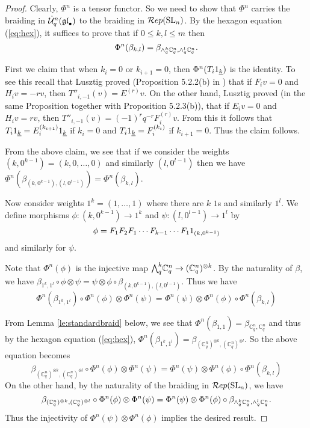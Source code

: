 \documentclass[11pt]{amsart}
\begin{document}
\begin{proof}
Clearly, $\Phi^n$ is a tensor functor.  So we need to show that $ \Phi^n $ carries the braiding in $ \dot{{\mathcal{U}}}_q^n({\mathfrak{gl}}_\bullet) $ to the braiding in $\mathcal{R}ep({\rm{SL}}_n) $.  By the hexagon equation (\ref{eq:hex}), it suffices to prove that if $ 0 \le k, l \le m $ then $$ \Phi^n(\beta_{k, l}) = \beta_{\wedge^{k}_{q} \mathbb C_q^n, \wedge^{l}_{q} \mathbb C_q^n}. $$

First we claim that when $ k_i = 0 $ or $ k_{i+1} = 0 $, then $ \Phi^n(T_i 1_{{\underline{k}}}) $ is the identity.  To see this recall that Lusztig proved (Proposition 5.2.2(b) in \cite{MR1227098}) that if $ F_i v = 0 $ and $ H_i v = -r v $, then $ T''_{i,-1}(v) = E^{(r)} v $.  On the other hand, Lusztig proved (in the same Proposition together with Proposition 5.2.3(b)), that if $ E_i v = 0 $ and $H_i v = rv $, then $ T''_{i,-1}(v) = (-1)^r q^{-r} F_i^{(r)} v $.  From this it follows that $ T_i 1_{{\underline{k}}} = E_i^{(k_{i+1})} 1_{{\underline{k}}} $ if $ k_i = 0 $ and $ T_i 1_{{\underline{k}}} = F_i^{(k_i)} $ if $ k_{i+1} = 0 $.  Thus the claim follows.

From the above claim, we see that if we consider the weights $ (k, 0^{k-1}) = (k, 0, \dots, 0)$ and similarly $ (l, 0^{l-1}) $ then we have $ \Phi^n(\beta_{(k, 0^{k-1}), (l, 0^{l-1})}) =  \Phi^n(\beta_{k, l})$.

Now consider weights $ 1^k = (1, \dots, 1) $ where there are $ k $ $1$s and similarly $ 1^l$.  We define morphisms $ \phi: (k, 0^{k-1})  \rightarrow 1^k$ and  $ \psi : (l, 0^{l-1}) \rightarrow 1^{l} $ by
$$
\phi = F_1 F_2 F_1 \cdots F_{k-1} \cdots F_1 1_{(k, 0^{k-1})}
$$
and similarly for $ \psi $.

Note that $ \Phi^n(\phi) $ is the injective map $ {\textstyle\bigwedge^{k}_{q}} \mathbb C_q^n \rightarrow (\mathbb C_q^n)^{\otimes k} $.  By the naturality of $ \beta $, we have $  \beta_{1^k, 1^l} \circ \phi \otimes \psi =  \psi \otimes \phi \circ \beta_{(k,0^{k-1}), (l, 0^{l-1})} $.  Thus we have
$$
  \Phi^n(\beta_{1^k, 1^l})\circ \Phi^n(\phi) \otimes \Phi^n(\psi) = \Phi^n(\psi) \otimes \Phi^n(\phi) \circ \Phi^n(\beta_{k,l})
$$

From Lemma \ref{le:standardbraid} below, we see that $ \Phi^n(\beta_{1,1}) = \beta_{\mathbb C_q^n, \mathbb C_q^n} $ and thus by the hexagon equation (\ref{eq:hex}), $\Phi^n(\beta_{1^k, 1^l}) = \beta_{(\mathbb C_q^n)^{\otimes k}, (\mathbb C_q^n)^{\otimes l}} $.  So the above equation becomes
$$
 \beta_{(\mathbb C_q^n)^{\otimes k}, (\mathbb C_q^n)^{\otimes l}} \circ \Phi^n(\phi) \otimes \Phi^n(\psi) = \Phi^n(\psi) \otimes \Phi^n(\phi) \circ  \Phi^n(\beta_{k,l})
$$
On the other hand, by the naturality of the braiding in $\mathcal{R}ep({\rm{SL}}_n)$, we have 
$$
 \beta_{(\mathbb C_q^n)^{\otimes k}, (\mathbb C_q^n)^{\otimes l}} \circ \Phi^n(\phi) \otimes \Phi^n(\psi) = \Phi^n(\psi) \otimes \Phi^n(\phi) \circ \beta_{\wedge^{k}_{q} \mathbb C_q^n, \wedge^{l}_{q} \mathbb C_q^n}.
$$
Thus the injectivity of $ \Phi^n(\psi) \otimes \Phi^n(\phi)$ implies the desired result.
\end{proof}
\end{document}
